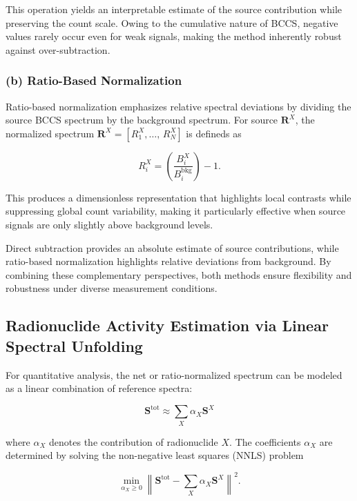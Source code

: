 \documentclass[10pt]{wlscirep}
\begin{document}
This operation yields an interpretable estimate of the source contribution while preserving the count scale. Owing to the cumulative nature of BCCS, negative values rarely occur even for weak signals, making the method inherently robust against over-subtraction.

\subsubsection*{(b) Ratio-Based Normalization} 

Ratio-based normalization emphasizes relative spectral deviations by dividing the source BCCS spectrum by the background spectrum. For source $\mathbf{R}^X$, the normalized spectrum $\mathbf{R}^X=[R^X_1,\ldots,\,R^X_N]$ is defineds as

\begin{equation}
R^X_i = \left(\dfrac{B^X_i}{B^{\textrm{bkg}}_i}\right) -1.
\end{equation}

This produces a dimensionless representation that highlights local contrasts while suppressing global count variability, making it particularly effective when source signals are only slightly above background levels.


Direct subtraction provides an absolute estimate of source contributions, while ratio-based normalization highlights relative deviations from background. By combining these complementary perspectives, both methods ensure flexibility and robustness under diverse measurement conditions.

\subsection*{Radionuclide Activity Estimation via Linear Spectral Unfolding}


For quantitative analysis, the net or ratio-normalized spectrum can be modeled as a linear combination of reference spectra:

\begin{equation}
\textbf{S}^{\textrm{tot}} \approx \sum_{X} \alpha_X \textbf{S}^{X}
\end{equation}

\noindent where $\alpha_X$ denotes the contribution of radionuclide $X$. The coefficients $\alpha_X$ are determined by solving the non-negative least squares (NNLS) problem

\begin{equation}
\min_{\alpha_X \ge 0} \left\| \textbf{S}^{\textrm{tot}} - \sum_{X} \alpha_X \textbf{S}^{X}\right\|^2 .
\end{equation}
\end{document}
